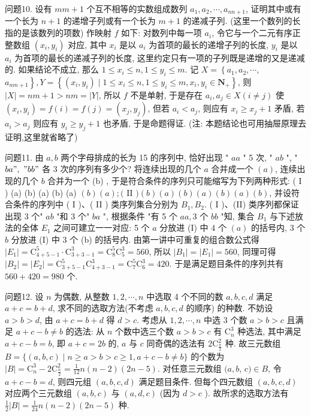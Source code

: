 问题10. 设有 $m m+1$ 个互不相等的实数组成数列 $a_1, a_2, \cdots, a_{n n+1}$, 证明其中或有一个长为 $n+1$ 的递增子列或有一个长为 $m+1$ 的递减子列.
(这里一个数列的长指的是该数列的项数)
作映射 $f$ 如下: 对数列中每一项 $a_i$, 令它与一个二元有序正整数组 $\left(x_i, y_i\right)$ 对应, 其中 $x_i$ 是以 $a_i$ 为首项的最长的递增子列的长度, $y_i$ 是以 $a_i$ 为首项的最长的递减子列的长度, 这里约定只有一项的子列既是递增的又是递减的.
如果结论不成立, 那么 $1 \leqslant x_i \leqslant n, 1 \leqslant y_i \leqslant m$. 记 $X=\left\{a_1, a_2, \cdots\right.$, $\left.a_{n m+1}\right\}, Y=\left\{\left(x_i, y_i\right) \mid 1 \leqslant x_i \leqslant n, 1 \leqslant y_i \leqslant m, x_i, y_i \in \mathbf{N}_{+}\right\}$, 则 $|X|= n m+1>n m=|Y|$, 所以 $f$ 不是单射, 于是存在 $a_i, a_j \in X(i \neq j)$ 使 $\left(x_i, y_i\right)=f(i)=f(j)=\left(x_j, y_j\right)$, 但若 $a_i<a_j$, 则应有 $x_i \geqslant x_j+1$ 矛盾, 若 $a_i>a_j$ 则应有 $y_i \geqslant y_j+1$ 也矛盾, 于是命题得证.
(注: 本题结论也可用抽屉原理去证明,这里就省略了)



问题11. 由 $a, b$ 两个字母排成的长为 15 的序列中, 恰好出现 " $a a$ " 5 次, " $a b$ ", " $b a ", ~ " b b "$ 各 3 次的序列有多少个?
将连续出现的几个 $a$ 合并成一个 $(a)$, 连续出现的几个 $b$ 合并为一个 (b) , 于是符合条件的序列只可能缩写为下列两种形式: ( I ) (a) (b) (a) (b) (a) $(b)(a) ;($ II $)(b)(a)(b)(a)(b)(a)(b)$, 并设符合条件的序列中 ( I )、( II ) 类序列集合分别为 $B_1, B_2$. ( I )、(II) 类序列都保证出现 3 个" $a b$ "和 3 个" $b a$ ", 根据条件 "有 5 个 $a a, 3$ 个 $b b$ "知, 集合 $B_1$ 与下述放法的全体 $E_1$ 之间可建立一一对应: 5 个 $a$ 分放进 (I) 中 4 个 $(a)$ 的括号内, 3 个 $b$ 分放进 (I) 中 3 个 (b) 的括号内.
由第一讲中可重复的组合数公式得 $\left|E_1\right|=\mathrm{C}_{4+5-1}^5 \cdot \mathrm{C}_{3+3-1}^3= \mathrm{C}_8^5 \mathrm{C}_5^3=560$, 所以 $\left|B_1\right|=\left|E_1\right|=560$, 同理可得 $\left|B_2\right|=\left|E_2\right|=\mathrm{C}_{3+5-1}^5 \mathrm{C}_{4+3-1}^3= \mathrm{C}_7^5 \mathrm{C}_6^3=420$. 于是满足题目条件的序列共有 $560+420=980$ 个.



问题12. 设 $n$ 为偶数, 从整数 $1,2, \cdots, n$ 中选取 4 个不同的数 $a, b, c, d$ 满足 $a+ c=b+d$, 求不同的选取方法(不考虑 $a, b, c, d$ 的顺序) 的种数.
不妨设 $a>b>d$, 由 $a+c=b+d$ 得 $d>c$. 考虑从 $1,2, \cdots, n$ 中选 3 个数 $a>b>c$ 且满足 $a+c-b \neq b$ 的选法: 从 $n$ 个数中选三个数 $a> b>c$ 有 $\mathrm{C}_n^3$ 种选法, 其中满足 $a+c-b=b$, 即 $a+c=2 b$ 的, $a$ 与 $c$ 同奇偶的选法有 $2 \mathrm{C}_{\frac{\pi}{2}}^2$ 种.
故三元数组 $B=\{(a, b, c) \mid n \geqslant a>b>c \geqslant 1, a+c-b \neq b\}$ 的个数为 $|B|=\mathrm{C}_n^3-2 \mathrm{C}_{\frac{n}{2}}^2=\frac{1}{12} n(n-2)(2 n-5)$. 对任意三元数组 $(a, b$, $c) \in B$, 令 $a+c-b=d$, 则四元组 $(a, b, c, d)$ 满足题目条件.
但每个四元数组 $(a, b, c, d)$ 对应两个三元数组 $(a, b, c)$ 与 $(a, d, c)$ (因为 $d>c$ ). 故所求的选取方法有 $\frac{1}{2}|B|=\frac{1}{24} n(n-2)(2 n-5)$ 种.



